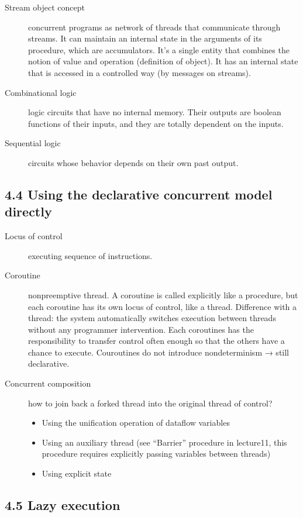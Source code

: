 \begin{description}
  \item[Stream object concept] concurrent programs as network of threads that communicate through streams.
    It can maintain an internal state in the arguments of its procedure, which are accumulators.
    It's a single entity that combines the notion of value and operation (definition of object).
    It has an internal state that is accessed in a controlled way (by messages on streams).
  \item[Combinational  logic] logic circuits that have no internal memory.
    Their outputs are boolean functions of their inputs, and they are totally dependent on the inputs.
  \item[Sequential logic] circuits whose behavior depends on their own past output.
\end{description}

\subsection{4.4 Using the declarative concurrent model directly}

\begin{description}
  \item[Locus of control] executing sequence of instructions.
  \item[Coroutine] nonpreemptive thread.
    A coroutine is called explicitly like a procedure, but each coroutine has its own locus of control, like a thread.
    Difference with a thread: the system automatically switches execution between threads without any programmer intervention.
    Each coroutines has the responsibility to transfer control often enough so that the others have a chance to execute.
    Couroutines do not introduce nondeterminism → still declarative.
  \item[Concurrent composition] how to join back a forked thread into the original thread of control?
    \begin{itemize}
      \item Using the unification operation of dataflow variables
      \item Using an auxiliary thread (see ``Barrier'' procedure in lecture11, this procedure requires explicitly passing variables between threads)
      \item Using explicit state
    \end{itemize}
\end{description}


\subsection{4.5 Lazy execution}

